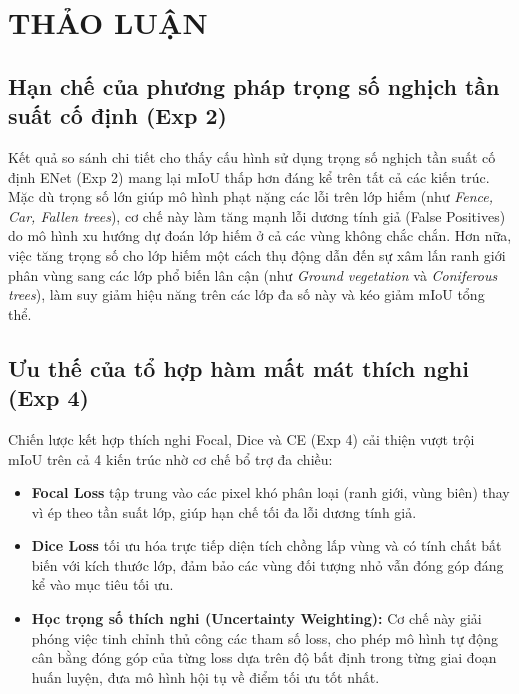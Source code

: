 \chapter{THẢO LUẬN}
\label{ch:thao_luan}

\section{Hạn chế của phương pháp trọng số nghịch tần suất cố định (Exp 2)}

Kết quả so sánh chi tiết cho thấy cấu hình sử dụng trọng số nghịch tần suất cố định ENet (Exp 2) mang lại mIoU thấp hơn đáng kể trên tất cả các kiến trúc. Mặc dù trọng số lớn giúp mô hình phạt nặng các lỗi trên lớp hiếm (như \textit{Fence, Car, Fallen trees}), cơ chế này làm tăng mạnh lỗi dương tính giả (False Positives) do mô hình xu hướng dự đoán lớp hiếm ở cả các vùng không chắc chắn. Hơn nữa, việc tăng trọng số cho lớp hiếm một cách thụ động dẫn đến sự xâm lấn ranh giới phân vùng sang các lớp phổ biến lân cận (như \textit{Ground vegetation} và \textit{Coniferous trees}), làm suy giảm hiệu năng trên các lớp đa số này và kéo giảm mIoU tổng thể.

\section{Ưu thế của tổ hợp hàm mất mát thích nghi (Exp 4)}

Chiến lược kết hợp thích nghi Focal, Dice và CE (Exp 4) cải thiện vượt trội mIoU trên cả 4 kiến trúc nhờ cơ chế bổ trợ đa chiều:
\begin{itemize}[leftmargin=1.4cm]
  \item \textbf{Focal Loss} tập trung vào các pixel khó phân loại (ranh giới, vùng biên) thay vì ép theo tần suất lớp, giúp hạn chế tối đa lỗi dương tính giả.
  \item \textbf{Dice Loss} tối ưu hóa trực tiếp diện tích chồng lấp vùng và có tính chất bất biến với kích thước lớp, đảm bảo các vùng đối tượng nhỏ vẫn đóng góp đáng kể vào mục tiêu tối ưu.
  \item \textbf{Học trọng số thích nghi (Uncertainty Weighting):} Cơ chế này giải phóng việc tinh chỉnh thủ công các tham số loss, cho phép mô hình tự động cân bằng đóng góp của từng loss dựa trên độ bất định trong từng giai đoạn huấn luyện, đưa mô hình hội tụ về điểm tối ưu tốt nhất.
\end{itemize}


